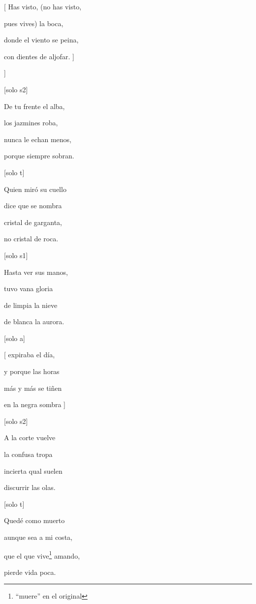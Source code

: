 {{[} Has visto, (no has visto,

  pues vives) la boca,

  donde el viento se peina,

  con dientes de aljofar. {]}
\vspace{2\baselineskip}

{]}

{[}solo s2{]}

De tu frente el alba,

los jazmines roba,

nunca le echan menos,

porque siempre sobran.
\vspace{2\baselineskip}

{[}solo t{]}

Quien miró su cuello

dice que se nombra

cristal de garganta,

no cristal de roca.
\vspace{2\baselineskip}

{[}solo s1{]}

Hasta ver sus manos,

tuvo vana gloria

de limpia la nieve

de blanca la aurora.
\vspace{2\baselineskip}

{[}solo a{]}

{[} expiraba el día,

  y porque las horas

  más y más se tiñen

  en la negra sombra {]}
\vspace{2\baselineskip}

{[}solo s2{]}

A la corte vuelve

la confusa tropa

incierta qual suelen

discurrir las olas.
\vspace{2\baselineskip}

{[}solo t{]}

Quedé como muerto

aunque sea a mi costa,

que el que vive\footnote{\textsuperscript{}``muere'' en el original} amando,

pierde vida poca.
\vspace{2\baselineskip}

}
